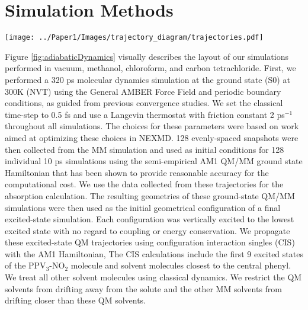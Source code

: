\section{Simulation Methods}

\noindent
\begin{minipage}[c]{\textwidth}
  \centering
  \texttt{[image: ../Paper1/Images/trajectory\_diagram/trajectories.pdf]}
  \label{fig:adiabaticDynamics}
\end{minipage}\bigskip

Figure \ref{fig:adiabaticDynamics} visually describes the layout of our simulations performed in vacuum, methanol, chloroform, and carbon tetrachloride.
   First, we performed a 320 ps molecular dynamics simulation at the ground state (S0) at 300K (NVT) using the General AMBER Force Field and periodic boundary conditions, as guided from previous convergence studies. \cite{silva2010benchmark}
We set the classical time-step to 0.5 fs and use a Langevin thermostat with friction constant 2 ps\(^{-1}\) throughout all simulations. The choices for these parameters were based on work aimed at optimizing these choices in NEXMD. \cite{nelson2012nonadiabatic}
   128 evenly-spaced snapshots were then collected from the MM simulation and used as initial conditions for 128 individual 10 ps simulations using the semi-empirical AM1 QM/MM ground state Hamiltonian that has been shown to provide reasonable accuracy for the computational cost. \cite{silva2010benchmark} We use the data collected from these trajectories for the absorption calculation.
   The resulting geometries of these ground-state QM/MM simulations were then used as the initial geometrical configuration of a final excited-state simulation. Each configuration was vertically excited to the lowest excited state with no regard to coupling or energy conservation. We propagate these excited-state QM trajectories using configuration interaction singles (CIS) with the AM1 Hamiltonian, 
   The CIS calculations include the first 9 excited states of the PPV\(_3\)-NO\(_2\) molecule and  solvent molecules closest to the central phenyl.
   We treat all other solvent molecules using classical dynamics.
   We restrict the QM solvents from drifting away from the solute and the other MM solvents from drifting closer than these QM solvents.

\noindent
	  \begin{multiFigure} 
	    \label{fig:PPV3NO2}
	  \end{multiFigure}
\bigskip

